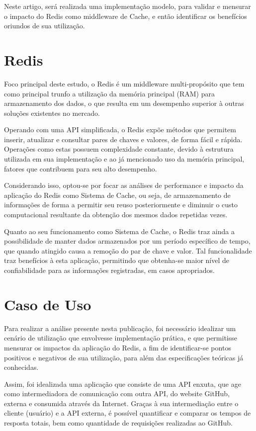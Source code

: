 \documentclass[12pt]{article}
\begin{document}
Neste artigo, será realizada uma implementação modelo, para validar e mensurar o impacto do Redis como middleware de Cache, e então identificar os benefícios oriundos de sua utilização.

\section{Redis}

Foco principal deste estudo, o Redis é um middleware multi-propósito que tem como principal trunfo a utilização da memória principal (RAM) para armazenamento dos dados, o que resulta em um desempenho superior à outras soluções existentes no mercado.

Operando com uma API simplificada, o Redis expõe métodos que permitem inserir, atualizar e consultar pares de chaves e valores, de forma fácil e rápida. Operações como estas possuem complexidade constante, devido à estrutura utilizada em sua implementação e ao já mencionado uso da memória principal, fatores que contribuem para seu alto desempenho.

Considerando isso, optou-se por focar as análises de performance e impacto da aplicação do Redis como Sistema de Cache, ou seja, de armazenamento de informações de forma a permitir seu reuso posteriormente e diminuir o custo computacional resultante da obtenção dos mesmos dados repetidas vezes.

Quanto ao seu funcionamento como Sistema de Cache, o Redis traz ainda a possibilidade de manter dados armazenados por um período específico de tempo, que quando atingido causa a remoção do par de chave e valor. Tal funcionalidade traz benefícios à esta aplicação, permitindo que obtenha-se maior nível de confiabilidade para as informações registradas, em casos apropriados.

\section{Caso de Uso}

Para realizar a análise presente nesta publicação, foi necessário idealizar um cenário de utilização que envolvesse implementação prática, e que permitisse mensurar os impactos da aplicação do Redis, a fim de identificar-se pontos positivos e negativos de sua utilização, para além das especificações teóricas já conhecidas.

Assim, foi idealizada uma aplicação que consiste de uma API enxuta, que age como intermediadora de comunicação com outra API, do website GitHub, externa e consumida através da Internet. Graças à sua intermediação entre o cliente (usuário) e a API externa, é possível quantificar e comparar os tempos de resposta totais, bem como quantidade de requisições realizadas ao GitHub.
\end{document}
